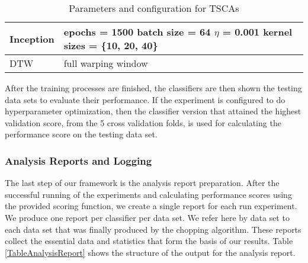 \begin{table}[hbt!]
\begin{tabularx}{\textwidth}{|X|X|}
  Inception           & epochs = 1500 \newline batch size = 64 \newline $\eta$ = 0.001 \newline
                        kernel sizes = \{10, 20, 40\}                                                        \\ \hline
  DTW                 & full warping window                                                                  \\ \hline
  \end{tabularx}
  \caption{Parameters and configuration for TSCAs}
  \label{TableClassifierParams}
\end{table}

After the training processes are finished, the classifiers are then shown the testing data sets to evaluate their performance.
If the experiment is configured to do hyperparameter optimization,
then the classifier version that attained the highest validation score, from the 5 cross validation folds, is used for calculating the performance score on the testing data set.


\subsubsection{Analysis Reports and Logging}
\label{SubsectionAnalysisReport}
The last step of our framework is the analysis report preparation.
After the successful running of the experiments and calculating performance scores using the provided scoring function, we create a single report for each run experiment.
We produce one report per classifier per data set.
We refer here by data set to each data set that was finally produced by the chopping algorithm.
These reports collect the essential data and statistics that form the basis of our results.
Table \ref{TableAnalysisReport} shows the structure of the output for the analysis report.

